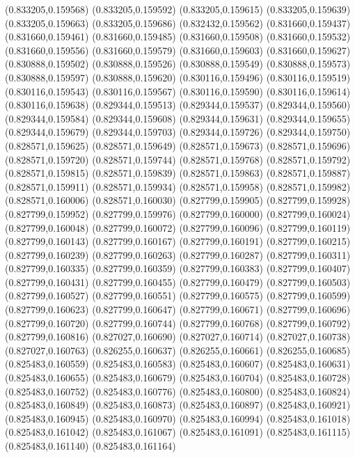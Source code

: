(0.833205,0.159568)
(0.833205,0.159592)
(0.833205,0.159615)
(0.833205,0.159639)
(0.833205,0.159663)
(0.833205,0.159686)
(0.832432,0.159562)
(0.831660,0.159437)
(0.831660,0.159461)
(0.831660,0.159485)
(0.831660,0.159508)
(0.831660,0.159532)
(0.831660,0.159556)
(0.831660,0.159579)
(0.831660,0.159603)
(0.831660,0.159627)
(0.830888,0.159502)
(0.830888,0.159526)
(0.830888,0.159549)
(0.830888,0.159573)
(0.830888,0.159597)
(0.830888,0.159620)
(0.830116,0.159496)
(0.830116,0.159519)
(0.830116,0.159543)
(0.830116,0.159567)
(0.830116,0.159590)
(0.830116,0.159614)
(0.830116,0.159638)
(0.829344,0.159513)
(0.829344,0.159537)
(0.829344,0.159560)
(0.829344,0.159584)
(0.829344,0.159608)
(0.829344,0.159631)
(0.829344,0.159655)
(0.829344,0.159679)
(0.829344,0.159703)
(0.829344,0.159726)
(0.829344,0.159750)
(0.828571,0.159625)
(0.828571,0.159649)
(0.828571,0.159673)
(0.828571,0.159696)
(0.828571,0.159720)
(0.828571,0.159744)
(0.828571,0.159768)
(0.828571,0.159792)
(0.828571,0.159815)
(0.828571,0.159839)
(0.828571,0.159863)
(0.828571,0.159887)
(0.828571,0.159911)
(0.828571,0.159934)
(0.828571,0.159958)
(0.828571,0.159982)
(0.828571,0.160006)
(0.828571,0.160030)
(0.827799,0.159905)
(0.827799,0.159928)
(0.827799,0.159952)
(0.827799,0.159976)
(0.827799,0.160000)
(0.827799,0.160024)
(0.827799,0.160048)
(0.827799,0.160072)
(0.827799,0.160096)
(0.827799,0.160119)
(0.827799,0.160143)
(0.827799,0.160167)
(0.827799,0.160191)
(0.827799,0.160215)
(0.827799,0.160239)
(0.827799,0.160263)
(0.827799,0.160287)
(0.827799,0.160311)
(0.827799,0.160335)
(0.827799,0.160359)
(0.827799,0.160383)
(0.827799,0.160407)
(0.827799,0.160431)
(0.827799,0.160455)
(0.827799,0.160479)
(0.827799,0.160503)
(0.827799,0.160527)
(0.827799,0.160551)
(0.827799,0.160575)
(0.827799,0.160599)
(0.827799,0.160623)
(0.827799,0.160647)
(0.827799,0.160671)
(0.827799,0.160696)
(0.827799,0.160720)
(0.827799,0.160744)
(0.827799,0.160768)
(0.827799,0.160792)
(0.827799,0.160816)
(0.827027,0.160690)
(0.827027,0.160714)
(0.827027,0.160738)
(0.827027,0.160763)
(0.826255,0.160637)
(0.826255,0.160661)
(0.826255,0.160685)
(0.825483,0.160559)
(0.825483,0.160583)
(0.825483,0.160607)
(0.825483,0.160631)
(0.825483,0.160655)
(0.825483,0.160679)
(0.825483,0.160704)
(0.825483,0.160728)
(0.825483,0.160752)
(0.825483,0.160776)
(0.825483,0.160800)
(0.825483,0.160824)
(0.825483,0.160849)
(0.825483,0.160873)
(0.825483,0.160897)
(0.825483,0.160921)
(0.825483,0.160945)
(0.825483,0.160970)
(0.825483,0.160994)
(0.825483,0.161018)
(0.825483,0.161042)
(0.825483,0.161067)
(0.825483,0.161091)
(0.825483,0.161115)
(0.825483,0.161140)
(0.825483,0.161164)
